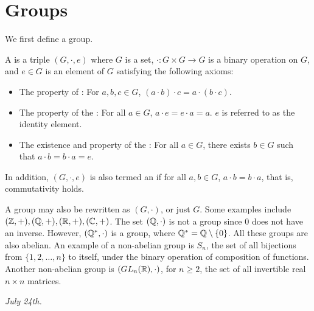 \section{Groups}
We first define a group.
\begin{definition}
    A  is a triple $(G, \cdot, e)$ where $G$ is a set, $\cdot: G \times G \to G$ is a binary operation on $G$, and $e \in G$ is an element of $G$ satisfying the following axioms:
    \begin{itemize}
        \item The property of : For $a,b,c \in G$, $(a \cdot b) \cdot c = a \cdot (b \cdot c)$.
        \item The property of the : For all $a \in G$, $a \cdot e = e \cdot a = a$. $e$ is referred to as the identity element.
        \item The existence and property of the : For all $a \in G$, there exists $b \in G$ such that $a \cdot b = b \cdot a = e$.
    \end{itemize}
    In addition, $(G,\cdot,e)$ is also termed an  if for all $a,b \in G$, $a \cdot b = b \cdot a$, that is, commutativity holds.
\end{definition}
A group may also be rewritten as $(G,\cdot)$, or just $G$. Some examples include $(\mathbb{Z}, +), (\mathbb{Q}, +), (\mathbb{R}, +), (\mathbb{C}, +)$. The set $(\mathbb{Q}, \cdot)$ is not a group since $0$ does not have an inverse. However, $(\mathbb{Q}^{\ast}, \cdot)$ is a group, where $\mathbb{Q}^{\ast} = \mathbb{Q}\setminus\{0\}$. All these groups are also abelian. An example of a non-abelian group is $S_{n}$, the set of all bijections from $\{1,2,\ldots,n\}$ to itself, under the binary operation of composition of functions. Another non-abelian group is $(GL_{n}(\mathbb{R}), \cdot)$, for $n \geq 2$, the set of all invertible real $n \times n$ matrices.

\textit{July 24th.}

